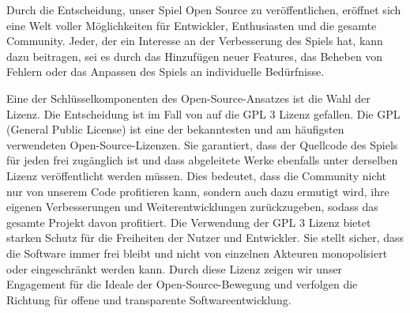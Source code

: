 Durch die Entscheidung, unser Spiel Open Source zu veröffentlichen, eröffnet sich eine Welt voller Möglichkeiten für Entwickler, Enthusiasten und die gesamte Community.
Jeder, der ein Interesse an der Verbesserung des Spiels hat, kann dazu beitragen, sei es durch das Hinzufügen neuer Features, das Beheben von Fehlern oder das Anpassen des Spiels an individuelle Bedürfnisse.

Eine der Schlüsselkomponenten des Open-Source-Ansatzes ist die Wahl der Lizenz.
Die Entscheidung ist im Fall von \ff auf die GPL 3 Lizenz gefallen.
Die GPL (General Public License) ist eine der bekanntesten und am häufigsten verwendeten Open-Source-Lizenzen.
Sie garantiert, dass der Quellcode des Spiels für jeden frei zugänglich ist und dass abgeleitete Werke ebenfalls unter derselben Lizenz veröffentlicht werden müssen.
Dies bedeutet, dass die Community nicht nur von unserem Code profitieren kann, sondern auch dazu ermutigt wird, ihre eigenen Verbesserungen und Weiterentwicklungen zurückzugeben, sodass das gesamte Projekt davon profitiert.
Die Verwendung der GPL 3 Lizenz bietet starken Schutz für die Freiheiten der Nutzer und Entwickler.
Sie stellt sicher, dass die Software immer frei bleibt und nicht von einzelnen Akteuren monopolisiert oder eingeschränkt werden kann.
Durch diese Lizenz zeigen wir unser Engagement für die Ideale der Open-Source-Bewegung und verfolgen die Richtung für offene und transparente Softwareentwicklung.
%
\renewcommand{\kapitelautor}{}